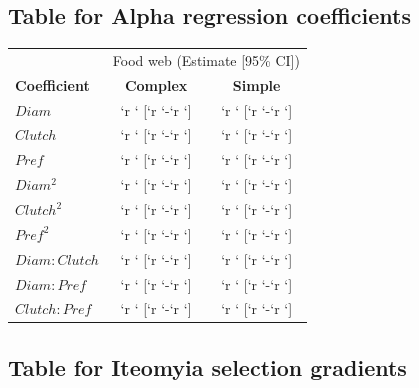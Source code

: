\documentclass[]{elsarticle} %
\begin{document}
\subsection{Table for Alpha regression
coefficients}\label{table-for-alpha-regression-coefficients}

\begin{table}[]
\begin{tabular}{lcc}
                                                                           \\ \hline
                       & \multicolumn{2}{c}{Food web (Estimate [95\% CI])} \\
\textbf{Coefficient}   & \textbf{Complex} & \textbf{Simple}                \\ \hline
$Diam$                 & `r ` [`r `-`r `] & `r ` [`r `-`r `]  \\
$Clutch$               & `r ` [`r `-`r `] & `r ` [`r `-`r `]  \\
$Pref$                 & `r ` [`r `-`r `] & `r ` [`r `-`r `]  \\
$Diam^2$               & `r ` [`r `-`r `] & `r ` [`r `-`r `]  \\
$Clutch^2$             & `r ` [`r `-`r `] & `r ` [`r `-`r `]  \\
$Pref^2$               & `r ` [`r `-`r `] & `r ` [`r `-`r `]  \\
$Diam:Clutch$          & `r ` [`r `-`r `] & `r ` [`r `-`r `]  \\
$Diam:Pref$            & `r ` [`r `-`r `] & `r ` [`r `-`r `]  \\
$Clutch:Pref$          & `r ` [`r `-`r `] & `r ` [`r `-`r `]              \\ \hline
\end{tabular}
\end{table}

\subsection{Table for Iteomyia selection
gradients}\label{table-for-iteomyia-selection-gradients}
\end{document}
